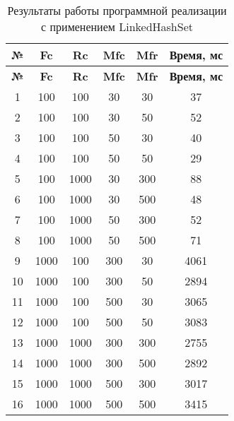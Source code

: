 \begin{longtable}{|c|c|c|c|c|c|}
    \caption{Результаты работы программной реализации с применением LinkedHashSet}
    \label{tab:linkedhashset}\\
    \hline
    \bfseries{№} & \bfseries{Fc} & \bfseries{Rc} & \bfseries{Mfc} & \bfseries{Mfr} & \bfseries{Время, мс} \\
    \hline
    \endfirsthead
    \hline
    \bfseries{№} & \bfseries{Fc} & \bfseries{Rc} & \bfseries{Mfc} & \bfseries{Mfr} & \bfseries{Время, мс} \\
    \hline
    \endhead
    \hline
    1 & 100 & 100 & 30 & 30 & 37 \\
    \hline
    2 & 100 & 100 & 30 & 50 & 52 \\
    \hline
    3 & 100 & 100 & 50 & 30 & 40 \\
    \hline
    4 & 100 & 100 & 50 & 50 & 29 \\
    \hline
    5 & 100 & 1000 & 30 & 300 & 88 \\
    \hline
    6 & 100 & 1000 & 30 & 500 & 48 \\
    \hline
    7 & 100 & 1000 & 50 & 300 & 52 \\
    \hline
    8 & 100 & 1000 & 50 & 500 & 71 \\
    \hline
    9 & 1000 & 100 & 300 & 30 & 4061 \\
    \hline
    10 & 1000 & 100 & 300 & 50 & 2894 \\
    \hline
    11 & 1000 & 100 & 500 & 30 & 3065 \\
    \hline
    12 & 1000 & 100 & 500 & 50 & 3083 \\
    \hline
    13 & 1000 & 1000 & 300 & 300 & 2755 \\
    \hline
    14 & 1000 & 1000 & 300 & 500 & 2892 \\
    \hline
    15 & 1000 & 1000 & 500 & 300 & 3017 \\
    \hline
    16 & 1000 & 1000 & 500 & 500 & 3415 \\
    \hline
\end{longtable}

